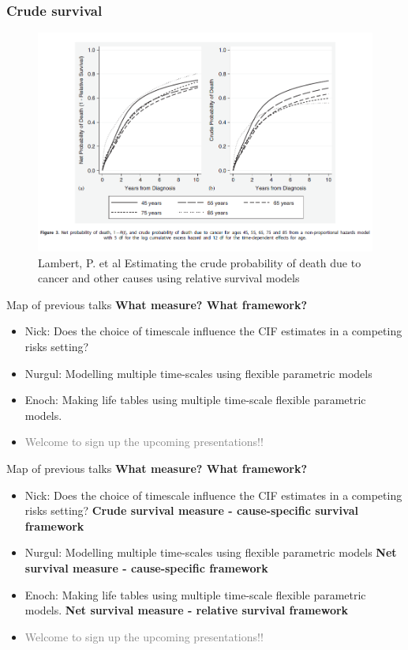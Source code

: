 \documentclass{beamer}
\begin{document}
\begin{frame}
\frametitle{Crude survival}
\begin{figure}
    \includegraphics[scale = 0.4]{pic1.png}
\caption{Lambert, P. et al Estimating the crude probability of death due to cancer and other causes using relative survival models}
\label{fig2}
\end{figure}
\end{frame}

\begin{frame}{Map of previous talks}
\textbf{What measure? What framework?}
\begin{itemize}
\item    Nick: Does the choice of timescale influence the CIF estimates in a competing risks setting? 
\item     Nurgul: Modelling multiple time-scales using flexible parametric models
\item     Enoch: Making life tables using multiple time-scale flexible parametric models.
\item    \textcolor{gray}{Welcome to sign up the upcoming presentations!!}
\end{itemize}  

\end{frame}

\begin{frame}{Map of previous talks}
\textbf{What measure? What framework?}

\begin{itemize}
\item    Nick: Does the choice of timescale influence the CIF estimates in a competing risks setting? \textbf{Crude survival measure - cause-specific survival framework}
\item     Nurgul: Modelling multiple time-scales using flexible parametric models \textbf{Net survival measure - cause-specific framework}
\item     Enoch: Making life tables using multiple time-scale flexible parametric models. \textbf{Net survival measure - relative survival framework}
\item    \textcolor{gray}{Welcome to sign up the upcoming presentations!!}
\end{itemize}  
\end{frame}
\end{document}
